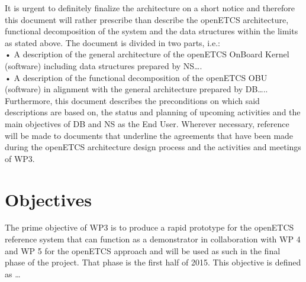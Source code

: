 \documentclass{template/openetcs_report}
\begin{document}
It is urgent to definitely finalize the architecture on a short notice and therefore this document will rather prescribe than describe the openETCS architecture, functional decomposition of the system and the data structures within the limits as stated above. The document is divided in two parts, i.e.:\\
•	A description of the general architecture of the openETCS OnBoard Kernel (software) including data structures prepared by NS….\\
•	A description of the functional decomposition of the openETCS OBU (software) in alignment with the general architecture prepared by DB…..\\


Furthermore, this document describes the preconditions on which said descriptions are based on, the status and planning of upcoming activities and the main objectives of DB and NS as the End User. Wherever necessary, reference will be made to documents that underline the agreements that have been made during the openETCS architecture design process and the activities and meetings of WP3. \\


\section{Objectives}

The prime objective of WP3 is to produce a rapid prototype for the openETCS reference system that can function as a demonstrator in collaboration with WP 4 and WP 5  for the openETCS approach and will be used as such in the final phase of the project. That phase is the first half of 2015.  This objective is defined as … 
\end{document}
